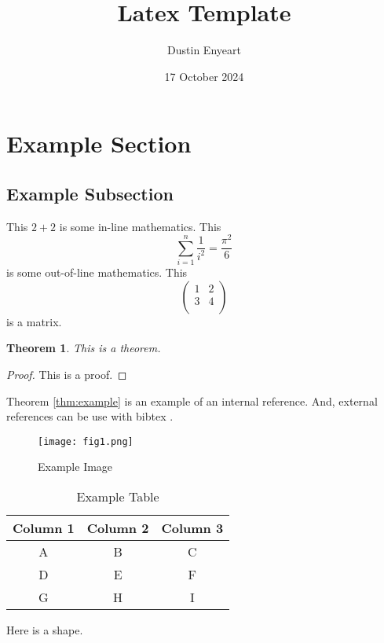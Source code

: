 \documentclass[12pt]{article}
\title{Latex Template}
\author{Dustin Enyeart}
\date{17 October 2024}
\newtheorem{theorem}{Theorem}
\begin{document}
\maketitle %

\section{Example Section}

\subsection{Example Subsection}

This $2+2$ is some in-line mathematics. 
This 
\[
    \sum_{i=1}^n \frac{1}{i^2} = \frac{\pi^2}{6}
\]
is some out-of-line mathematics.
This
\[
    \begin{pmatrix}
    1 & 2 \\
    3 & 4 \\
    \end{pmatrix}
\]
is a matrix. 


\begin{theorem}
This is a theorem.
\end{theorem}
\label{thm:example}

\begin{proof}
This is a proof. 
\end{proof}

Theorem \ref{thm:example} is an example of an internal reference.
And, external references can be use with bibtex \cite{feynman2014qed, vaswani2017attention, enyeart2024latex}. 

\begin{figure}[H]
    \centering
    \texttt{[image: fig1.png]}
    \caption{Example Image}
\end{figure}


\begin{table}
    \centering
    \caption{Example Table}
    \begin{tabular}{c|c|c}
        Column 1 & Column 2 & Column 3 \\ \hline
        A & B & C \\ \hline
        D & E & F \\ \hline
        G & H & I \\ 
    \end{tabular}
    \label{tab:example}
\end{table}


Here is a shape. 
\end{document}

